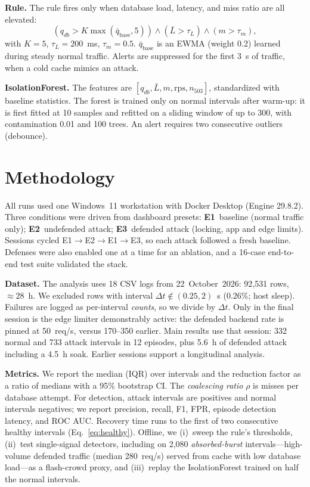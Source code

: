\documentclass[journal]{IEEEtran}
\begin{document}
\textbf{Rule.} The rule fires only when database load, latency, and miss ratio are all
elevated:
\begin{equation}
(q_{db} > K\max(\bar q_{\mathrm{base}},5)) \wedge (\bar L>\tau_L) \wedge (m>\tau_m),
\label{eq:rule}
\end{equation}
with $K=5$, $\tau_L=200$~ms, $\tau_m=0.5$. $\bar q_{\mathrm{base}}$ is an EWMA
(weight 0.2) learned during steady normal traffic. Alerts are suppressed for the first
3~s of traffic, when a cold cache mimics an attack.

\textbf{IsolationForest.} The features are
$[q_{db},\bar L, m, \text{rps}, n_{503}]$, standardized with baseline statistics. The
forest is trained only on normal intervals after warm-up: it is first fitted at 10
samples and refitted on a sliding window of up to 300, with contamination 0.01 and 100
trees. An alert requires two consecutive outliers (debounce).

\section{Methodology}
\label{sec:method}
All runs used one Windows~11 workstation with Docker Desktop (Engine 29.8.2). Three
conditions were driven from dashboard presets: \textbf{E1}~baseline (normal traffic
only); \textbf{E2}~undefended attack; \textbf{E3}~defended attack (locking, app and edge
limits). Sessions cycled E1$\rightarrow$E2$\rightarrow$E1$\rightarrow$E3, so each attack
followed a fresh baseline. Defenses were also enabled one at a time for an ablation, and
a 16-case end-to-end test suite validated the stack.

\textbf{Dataset.} The analysis uses 18 CSV logs from 22~October~2026: 92{,}531 rows,
${\approx}28$~h. We excluded rows with interval $\Delta t\notin(0.25,2)$~s (0.26\%;
host sleep). Failures are logged as per-interval \emph{counts}, so we divide by
$\Delta t$. Only in the final session is the edge limiter demonstrably active: the
defended backend rate is pinned at 50~req/s, versus 170--350 earlier. Main results use
that session: 332 normal and 733 attack intervals in 12 episodes, plus 5.6~h of
defended attack including a 4.5~h soak. Earlier sessions support a longitudinal
analysis.

\textbf{Metrics.} We report the median (IQR) over intervals and the reduction factor as
a ratio of medians with a 95\% bootstrap CI. The \emph{coalescing
ratio} $\rho$ is misses per database attempt. For detection, attack intervals are
positives and normal intervals negatives; we report precision, recall, F1, FPR, episode
detection latency, and ROC AUC. Recovery time runs to the first of
two consecutive healthy intervals (Eq.~\ref{eq:healthy}). Offline, we (i)~sweep the
rule's thresholds, (ii)~test single-signal detectors, including on 2{,}080
\emph{absorbed-burst} intervals---high-volume defended traffic (median 280~req/s)
served from cache with low database load---as a flash-crowd proxy, and (iii)~replay the
IsolationForest trained on half the normal intervals.
\end{document}
